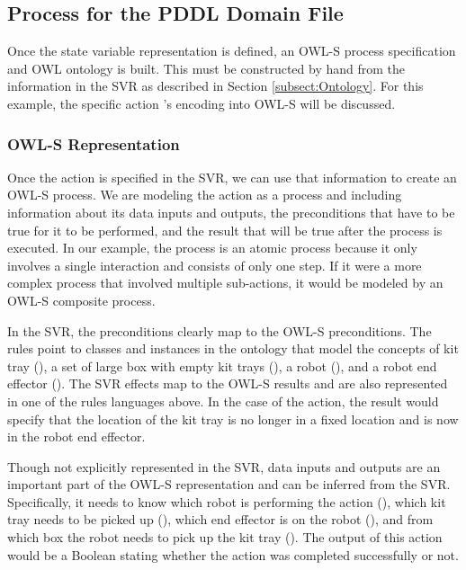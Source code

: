 \subsection{Process for the PDDL Domain File}
\label{subsect:PDDL_Domain_File}
Once the state variable representation is defined, an OWL-S process specification and OWL ontology is built. This must be constructed by hand from the information in the SVR as described in Section \ref{subsect:Ontology}. For this example, the specific action  's encoding into OWL-S will be discussed.

\subsubsection{OWL-S Representation}
Once the action is specified in the SVR, we can use that information to create an OWL-S process. We are modeling the action as a process and including information about its data inputs and outputs, the preconditions that have to be true for it to be performed, and the result that will be true after the process is executed. In our example, the process is an atomic process because it only involves a single interaction and consists of only one step. If it were a more complex process that involved multiple sub-actions, it would be modeled by an OWL-S composite process.

In the SVR, the preconditions clearly map to the OWL-S preconditions.
The rules point to classes and instances in the ontology that model the concepts of kit tray (), a set of large box with empty kit trays (), a robot (), and a robot end effector (). The SVR effects map to the OWL-S results and are also represented in one of the rules languages above. In the case of the  action, the result would specify that the location of the kit tray is no longer in a fixed location and is now in the robot end effector.

Though not explicitly represented in the SVR, data inputs and outputs are an important part of the OWL-S representation and can be inferred from the SVR. Specifically, it needs to know which robot is performing the action (), which kit tray needs to be picked up (), which end effector is on the robot (), and from which box the robot needs to pick up the kit tray (). The output of this action would be a Boolean stating whether the action was completed successfully or not.

